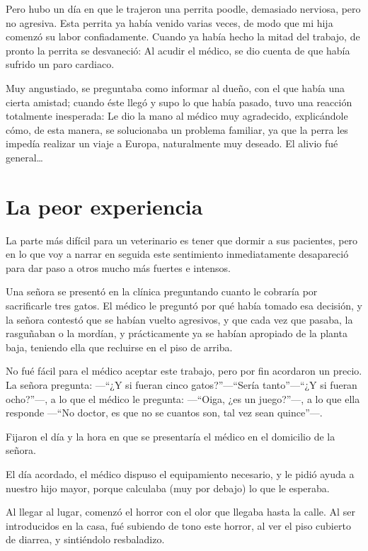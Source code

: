 \documentclass[letterpaper, 12pt]{book}
\begin{document}
Pero hubo un día en que le trajeron una perrita poodle, demasiado nerviosa, pero no agresiva. Esta perrita ya había venido varias veces, de modo que mi hija comenzó su labor confiadamente. Cuando ya había hecho la mitad del trabajo, de pronto la perrita se desvaneció: Al acudir el médico, se dio cuenta de que había sufrido un paro cardiaco. 

Muy angustiado, se preguntaba como informar al dueño, con el que había una cierta amistad; cuando éste llegó y supo lo que había pasado, tuvo una reacción totalmente inesperada: Le dio la mano al médico muy agradecido, explicándole cómo, de esta manera, se solucionaba un problema familiar, ya que la perra les impedía realizar un viaje a Europa, naturalmente muy deseado. El alivio fué general\ldots

\chapter{La peor experiencia}

La parte más difícil para un veterinario es tener que dormir a sus pacientes, pero en lo que voy a narrar en seguida este sentimiento inmediatamente desapareció para dar paso a otros mucho más fuertes e intensos.

Una señora se presentó en la clínica preguntando cuanto le cobraría por sacrificarle tres gatos. El médico le preguntó por qué había tomado esa decisión, y la señora contestó que se habían vuelto agresivos, y que cada vez que pasaba, la rasguñaban o la mordían, y prácticamente ya se habían apropiado de la planta baja, teniendo ella que recluirse en el piso de arriba.

No fué fácil para el médico aceptar este trabajo, pero por fin acordaron un precio. La señora pregunta: ---``¿Y si fueran cinco gatos?''---``Sería tanto''---``¿Y si fueran ocho?''---, a lo que el médico le pregunta: ---``Oiga, ¿es un juego?''---, a lo que ella responde ---``No doctor, es que no se cuantos son, tal vez sean quince''---. 

Fijaron el día y la hora en que se presentaría el médico en el domicilio de la señora.

El día acordado, el médico dispuso el equipamiento necesario, y le pidió ayuda a nuestro hijo mayor, porque calculaba (muy por debajo) lo que le esperaba. 

Al llegar al lugar, comenzó el horror con el olor que llegaba hasta la calle. Al ser introducidos en la casa, fué subiendo de tono este horror, al ver el piso cubierto de diarrea, y sintiéndolo resbaladizo.
\end{document}
